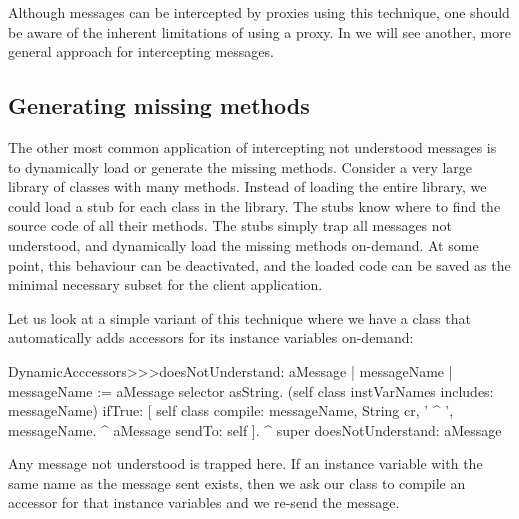 \documentclass[a4paper,10pt,twoside]{book}
\begin{document}
Although messages can be intercepted by proxies using this technique, one should be aware of the inherent limitations of using a proxy.  In  we will see another, more general approach for intercepting messages.

\subsection{Generating missing methods}

The other most common application of intercepting not understood messages is to dynamically load or generate the missing methods.
Consider a very large library of classes with many methods.  Instead of loading the entire library, we could load a stub for each class in the library. The stubs know where to find the source code of all their methods.  The stubs simply trap all messages not understood, and dynamically load the missing methods on-demand.  At some point, this behaviour can be deactivated, and the loaded code can be saved as the minimal necessary subset for the client application.


Let us look at a simple variant of this technique where we have a class that automatically adds accessors for its instance variables on-demand:

\begin{code}{}
DynamicAcccessors>>>doesNotUnderstand: aMessage
	| messageName |
	messageName := aMessage selector asString.
	(self class instVarNames includes: messageName)
		ifTrue: [
			self class compile: messageName, String cr, ' ^ ', messageName.
			^ aMessage sendTo: self ].
	^ super doesNotUnderstand: aMessage
\end{code}
Any message not understood is trapped here. If an instance variable with the same name as the message sent exists, then we ask our class to compile an accessor for that instance variables and we re-send the message.
\end{document}
